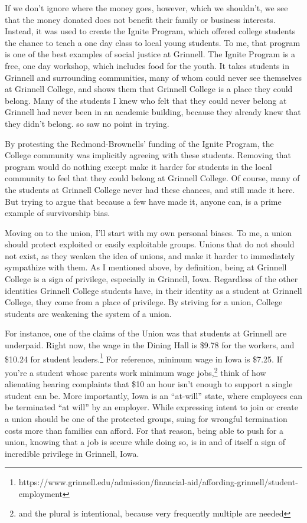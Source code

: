 \documentclass[12pt]{article}[titlepage]
\newcommand{\say}[1]{``#1''}
\newcommand{\1}{\={a}}
\newcommand{\2}{\={e}}
\newcommand{\3}{\={\i}}
\newcommand{\4}{\=o}
\newcommand{\5}{\=u}
\newcommand{\6}{\={A}}
\renewcommand{\,}{\textsuperscript{,}}
\begin{document}
If we don't ignore where the money goes, however, which we shouldn't, we see that the money donated does not benefit their family or business interests.
Instead, it was used to create the Ignite Program, which offered college students the chance to teach a one day class to local young students.
To me, that program is one of the best examples of social justice at Grinnell.
The Ignite Program is a free, one day workshop, which includes food for the youth.
It takes students in Grinnell and surrounding communities, many of whom could never see themselves at Grinnell College, and shows them that Grinnell College is a place they could belong.
Many of the students I knew who felt that they could never belong at Grinnell had never been in an academic building, because they already knew that they didn't belong. so saw no point in trying.

By protesting the Redmond-Brownells' funding of the Ignite Program, the College community was implicitly agreeing with these students.
Removing that program would do nothing except make it harder for students in the local community to feel that they could belong at Grinnell College.
Of course, many of the students at Grinnell College never had these chances, and still made it here.
But trying to argue that because a few have made it, anyone can, is a prime example of survivorship bias.

Moving on to the union, I'll start with my own personal biases.
To me, a union should protect exploited or easily exploitable groups.
Unions that do not should not exist, as they weaken the idea of unions, and make it harder to immediately sympathize with them.
As I mentioned above, by definition, being at Grinnell College is a sign of privilege, especially in Grinnell, Iowa.
Regardless of the other identities Grinnell College students have, in their identity as a student at Grinnell College, they come from a place of privilege.
By striving for a union, College students are weakening the system of a union.

For instance, one of the claims of the Union was that students at Grinnell are underpaid.
Right now, the wage in the Dining Hall is \$9.78 for the workers, and \$10.24 for student leaders.\footnote{https://www.grinnell.edu/admission/financial-aid/affording-grinnell/student-employment}
For reference, minimum wage in Iowa is \$7.25.
If you're a student whose parents work minimum wage jobs,\footnote{and the plural is intentional, because very frequently multiple are needed} think of how alienating hearing complaints that \$10 an hour isn't enough to support a single student can be.
More importantly, Iowa is an \say{at-will} state, where employees can be terminated \say{at will} by an employer.
While expressing intent to join or create a union should be one of the protected groups, suing for wrongful termination costs more than families can afford.
For that reason, being able to push for a union, knowing that a job is secure while doing so, is in and of itself a sign of incredible privilege in Grinnell, Iowa.
\end{document}

